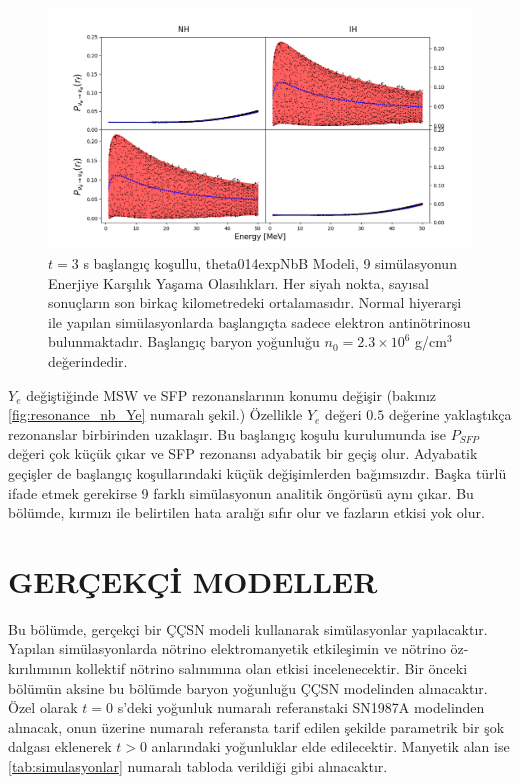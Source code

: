 \begin{figure}[hbt!]
    \centering
    \includegraphics[width=\textwidth]{figures/theta014expNbB_t3s_energySpec_theta0_averaged.png}
    \caption[$ t=3 $ s başlangıç koşullu, theta014expNbB Modeli, 9 simülasyonun Enerjiye Karşılık Yaşama Olasılıkları.]{$ t=3 $ s başlangıç koşullu, theta014expNbB Modeli, 9 simülasyonun Enerjiye Karşılık Yaşama Olasılıkları. Her siyah nokta, sayısal sonuçların son birkaç kilometredeki ortalamasıdır. Normal hiyerarşi ile yapılan simülasyonlarda başlangıçta sadece elektron antinötrinosu bulunmaktadır. Başlangıç baryon yoğunluğu $ n_{0}=2.3\times 10^{6} $ g/cm$ ^{3} $ değerindedir.}
    \label{fig:theta014expNbB_t3s_energySpec_theta0_averaged}
\end{figure}

$ Y_{e}$ değiştiğinde MSW ve SFP rezonanslarının konumu değişir (bakınız \ref{fig:resonance_nb_Ye} numaralı şekil.) Özellikle $ Y_{e}$ değeri  $ 0.5 $ değerine yaklaştıkça rezonanslar birbirinden uzaklaşır. Bu başlangıç koşulu kurulumunda ise $ P_{SFP} $ değeri çok küçük çıkar ve SFP rezonansı adyabatik bir geçiş olur. Adyabatik geçişler de başlangıç koşullarındaki küçük değişimlerden bağımsızdır. Başka türlü ifade etmek gerekirse 9 farklı simülasyonun analitik öngörüsü aynı çıkar. Bu bölümde, kırmızı ile belirtilen hata aralığı sıfır olur ve fazların etkisi yok olur.

\section{GERÇEKÇİ MODELLER}\label{sec:gercekciModeller}
Bu bölümde, gerçekçi bir ÇÇSN modeli kullanarak simülasyonlar yapılacaktır. Yapılan simülasyonlarda nötrino elektromanyetik etkileşimin ve nötrino öz-kırılımının kollektif nötrino salınımına olan etkisi incelenecektir. Bir önceki bölümün aksine bu bölümde baryon yoğunluğu ÇÇSN modelinden alınacaktır. Özel olarak $ t=0 $ s'deki yoğunluk \cite{1987ESOC...26..325N} numaralı referanstaki SN1987A modelinden alınacak, onun üzerine \cite{Athar:1995cx} numaralı referansta tarif edilen şekilde parametrik bir şok dalgası eklenerek $ t>0 $ anlarındaki yoğunluklar elde edilecektir. Manyetik alan ise \ref{tab:simulasyonlar} numaralı tabloda verildiği gibi alınacaktır.

